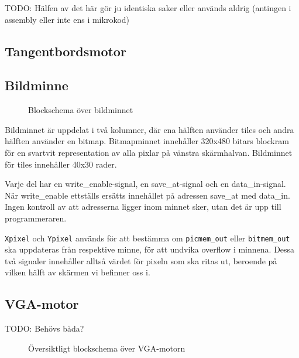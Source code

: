 \documentclass[]{article}
\begin{document}
TODO: Hälfen av det här gör ju identiska saker eller används aldrig (antingen i assembly eller inte ens i mikrokod)


\subsection{Tangentbordsmotor}

\subsection{Bildminne}
\begin{figure}[h!]
	\caption{Blockschema över bildminnet}
\end{figure}

Bildminnet är uppdelat i två kolumner, där ena hälften använder tiles och andra hälften använder en bitmap. Bitmapminnet innehåller 320x480 bitars blockram för en svartvit representation av alla pixlar på vänstra skärmhalvan. Bildminnet för tiles innehåller 40x30 rader.

Varje del har en write\_enable-signal, en save\_at-signal och en data\_in-signal. När write\_enable ettställs ersätts innehållet på adressen save\_at med data\_in. Ingen kontroll av att adresserna ligger inom minnet sker, utan det är upp till programmeraren.

\label{parag:picmempixel}
\texttt{Xpixel} och \texttt{Ypixel} används för att bestämma om \texttt{picmem\_out} eller \texttt{bitmem\_out} ska uppdateras från respektive minne, för att undvika overflow i minnena. Dessa två signaler innehåller alltså värdet för pixeln som ska ritas ut, beroende på vilken hälft av skärmen vi befinner oss i.

\newpage
\subsection{VGA-motor}
TODO: Behövs båda?
\begin{figure}[h!]
	\caption{Översiktligt blockschema över VGA-motorn}
\end{figure}
\end{document}
